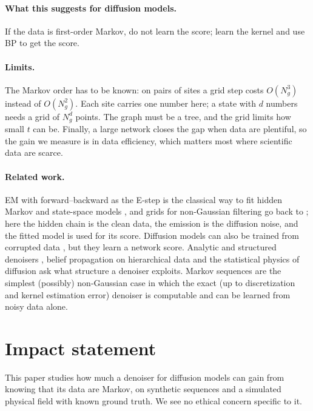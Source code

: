 \documentclass{article}
\begin{document}
\paragraph{What this suggests for diffusion models.} If the data is first-order Markov, do not learn the score; learn the kernel and use BP to get the score.

\paragraph{Limits.} The Markov order has to be known: on pairs of sites a grid step costs $O(N_g^3)$ instead of
$O(N_g^2)$. Each site carries one number here; a state with $d$ numbers needs a grid of $N_g^d$ points. The graph must be
a tree, and the grid limits how small $t$ can be. Finally, a large network closes the gap when data are plentiful, so the
gain we measure is in data efficiency, which matters most where scientific data are scarce.

\paragraph{Related work.} EM with forward--backward as the E-step is the classical way to fit hidden Markov and
state-space models \cite{baum1970,rabiner1989tutorial,shumway1982em,cappe2005}, and grids for non-Gaussian filtering go
back to \cite{kitagawa1987}; here the hidden chain is the clean data, the emission is the diffusion noise, and the
fitted model is used for its score. Diffusion models can also be trained from corrupted data
\cite{daras2023ambient,rozet2024learning,bai2024em}, but they learn a network score. Analytic and structured denoisers
\cite{kamb2024analytic,kadkhodaie2024generalization}, belief propagation on hierarchical data
\cite{garnierbrun2024transformers,sclocchi2025phase,mei2024unets} and the statistical physics of diffusion
\cite{biroli2023generative,biroli2024dynamical,achilli2025memorization,bonnaire2025memorize,garnierbrun2026biased,garnierbrun2026foam}
ask what structure a denoiser exploits. Markov sequences are the simplest (possibly) non-Gaussian case in which the exact (up to discretization and kernel estimation error) denoiser
is computable and can be learned from noisy data alone.

\section*{Impact statement}
This paper studies how much a denoiser for diffusion models can gain from knowing that its data are Markov, on
synthetic sequences and a simulated physical field with known ground truth. We see no ethical concern specific to it.
\end{document}
